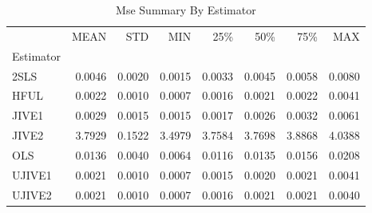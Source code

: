 \begin{table}[ht]
\centering
\caption{Mse Summary By Estimator}
\begin{tabular}{lrrrrrrr}
\toprule
 & MEAN & STD & MIN & 25\% & 50\% & 75\% & MAX \\
Estimator &  &  &  &  &  &  &  \\
\midrule
2SLS & 0.0046 & 0.0020 & 0.0015 & 0.0033 & 0.0045 & 0.0058 & 0.0080 \\
HFUL & 0.0022 & 0.0010 & 0.0007 & 0.0016 & 0.0021 & 0.0022 & 0.0041 \\
JIVE1 & 0.0029 & 0.0015 & 0.0015 & 0.0017 & 0.0026 & 0.0032 & 0.0061 \\
JIVE2 & 3.7929 & 0.1522 & 3.4979 & 3.7584 & 3.7698 & 3.8868 & 4.0388 \\
OLS & 0.0136 & 0.0040 & 0.0064 & 0.0116 & 0.0135 & 0.0156 & 0.0208 \\
UJIVE1 & 0.0021 & 0.0010 & 0.0007 & 0.0015 & 0.0020 & 0.0021 & 0.0041 \\
UJIVE2 & 0.0021 & 0.0010 & 0.0007 & 0.0016 & 0.0021 & 0.0021 & 0.0040 \\
\bottomrule
\end{tabular}
\end{table}
